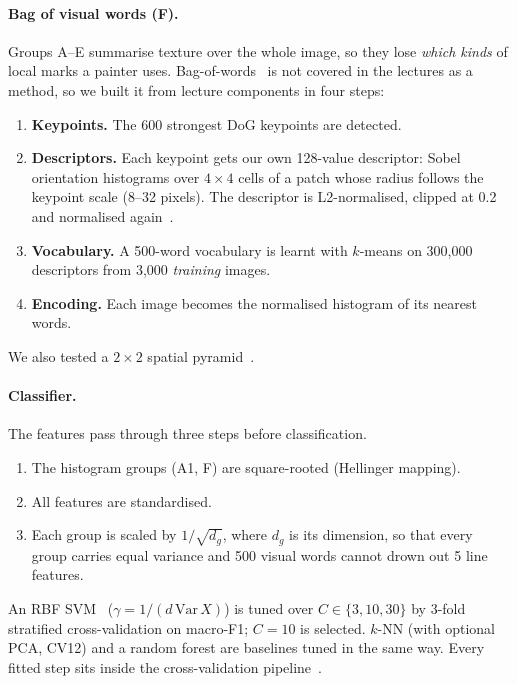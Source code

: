 \documentclass[10pt,twocolumn,a4paper]{article}
\begin{document}
\paragraph{Bag of visual words (F).}
Groups A--E summarise texture over the whole image, so they lose \emph{which kinds} of local marks a painter uses. Bag-of-words~\cite{csurka2004visual} is not covered in the lectures as a method, so we built it from lecture components in four steps:
\begin{enumerate}
\item \textbf{Keypoints.} The 600 strongest DoG keypoints are detected.
\item \textbf{Descriptors.} Each keypoint gets our own 128-value descriptor: Sobel orientation histograms over $4{\times}4$ cells of a patch whose radius follows the keypoint scale (8--32 pixels). The descriptor is L2-normalised, clipped at 0.2 and normalised again~\cite{lowe2004distinctive}.
\item \textbf{Vocabulary.} A 500-word vocabulary is learnt with $k$-means on 300{,}000 descriptors from 3{,}000 \emph{training} images.
\item \textbf{Encoding.} Each image becomes the normalised histogram of its nearest words.
\end{enumerate}
We also tested a $2{\times}2$ spatial pyramid~\cite{lazebnik2006beyond}.

\paragraph{Classifier.}
The features pass through three steps before classification.
\begin{enumerate}
\item The histogram groups (A1, F) are square-rooted (Hellinger mapping).
\item All features are standardised.
\item Each group is scaled by $1/\sqrt{d_g}$, where $d_g$ is its dimension, so that every group carries equal variance and 500 visual words cannot drown out 5 line features.
\end{enumerate}
An RBF SVM~\cite{cortes1995support} ($\gamma=1/(d\,\mathrm{Var}\,X)$) is tuned over $C\in\{3,10,30\}$ by 3-fold stratified cross-validation on macro-F1; $C{=}10$ is selected. $k$-NN (with optional PCA, CV12) and a random forest are baselines tuned in the same way. Every fitted step sits inside the cross-validation pipeline~\cite{pedregosa2011scikit}.
\end{document}
